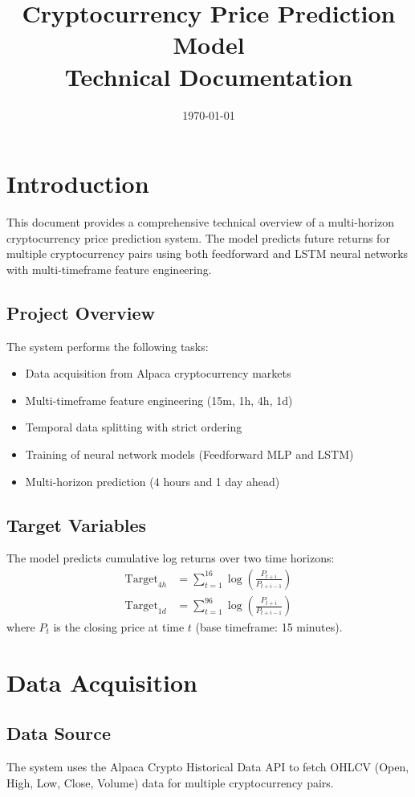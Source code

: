 \documentclass[12pt,a4paper]{article}
\title{Cryptocurrency Price Prediction Model\\
\large Technical Documentation}
\author{}
\date{\today}
\begin{document}
\maketitle
\tableofcontents
\newpage

\section{Introduction}

This document provides a comprehensive technical overview of a multi-horizon cryptocurrency price prediction system. The model predicts future returns for multiple cryptocurrency pairs using both feedforward and LSTM neural networks with multi-timeframe feature engineering.

\subsection{Project Overview}
The system performs the following tasks:
\begin{itemize}
    \item Data acquisition from Alpaca cryptocurrency markets
    \item Multi-timeframe feature engineering (15m, 1h, 4h, 1d)
    \item Temporal data splitting with strict ordering
    \item Training of neural network models (Feedforward MLP and LSTM)
    \item Multi-horizon prediction (4 hours and 1 day ahead)
\end{itemize}

\subsection{Target Variables}
The model predicts cumulative log returns over two time horizons:
\begin{align}
    \text{Target}_{4h} &= \sum_{t=1}^{16} \log\left(\frac{P_{t+i}}{P_{t+i-1}}\right) \\
    \text{Target}_{1d} &= \sum_{t=1}^{96} \log\left(\frac{P_{t+i}}{P_{t+i-1}}\right)
\end{align}
where $P_t$ is the closing price at time $t$ (base timeframe: 15 minutes).

\section{Data Acquisition}

\subsection{Data Source}
The system uses the Alpaca Crypto Historical Data API to fetch OHLCV (Open, High, Low, Close, Volume) data for multiple cryptocurrency pairs.
\end{document}
